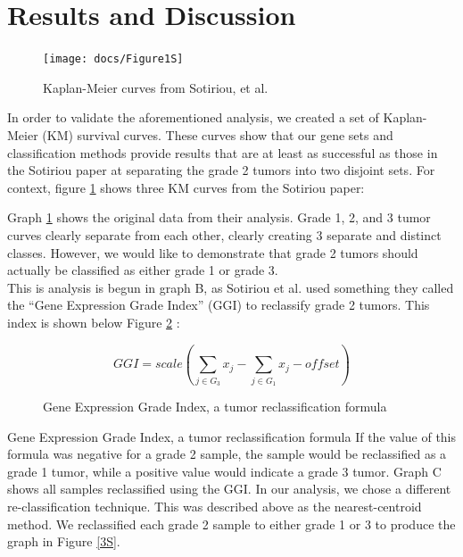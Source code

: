 \documentclass[a4paper,10pt]{article}
\begin{document}
\section{Results and Discussion}
\begin{figure}
\centering
\texttt{[image: docs/Figure1S]}
\caption{Kaplan-Meier curves from Sotiriou, et al.}\label{1S}
\end{figure}

In order to validate the aforementioned analysis, we created a set of Kaplan-Meier 
(KM) survival curves. These curves show that our gene sets and classification 
methods provide results that are at least as successful as those in the Sotiriou 
paper at separating the grade 2 tumors into two disjoint sets. 
For context, figure \ref{1S} shows three KM curves from the Sotiriou paper:

Graph \ref{1S} shows the original data from their analysis. Grade 1, 2, and 3 tumor 
curves clearly separate from each other, clearly creating 3 separate and distinct 
classes. However, we would like to demonstrate that grade 2 tumors should 
actually be classified as either grade 1 or grade 3. \\

This is analysis is begun in graph B, as Sotiriou et al. used something 
they called the “Gene Expression Grade Index” (GGI) to reclassify 
grade 2 tumors. This index is shown below Figure \ref{ggi} :\\

\begin{figure}
$$
GGI = scale\left( \sum_{j\in G_3}{ x_j } - \sum_{j\in G_1}{ x_j } - offset  \right)
$$\caption{Gene Expression Grade Index, a tumor reclassification formula}\label{ggi}
\end{figure}

Gene Expression Grade Index, a tumor reclassification formula
If the value of this formula was negative for a grade 2 sample, 
the sample would be reclassified as a grade 1 tumor, while a positive 
value would indicate a grade 3 tumor. Graph C shows all samples reclassified using the GGI.
In our analysis, we chose a different re-classification technique. 
This was described above as the nearest-centroid method. We reclassified 
each grade 2 sample to either grade 1 or 3 to produce the graph in Figure \ref{3S}.\\
\end{document}
